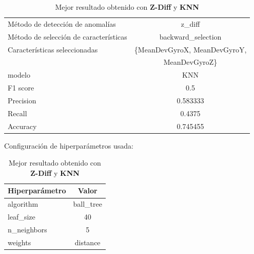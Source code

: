 \begin{appendices}
		\begin{table}[htb]
			\centering
			\caption{Mejor resultado obtenido con \textbf{Z-Diff} y \textbf{KNN}}
			\label{table:18}
			\begin{tabular}{lc}
				\toprule
				\midrule
					  Método de detección de anomalías &                                     z\_diff \\
				Método de selección de características &                         backward\_selection \\
						 Características seleccionadas & \{MeanDevGyroX, MeanDevGyroY, \\
						 							   & 							MeanDevGyroZ\}   \\
												modelo &                                        KNN \\
											  F1 score &                                        0.5 \\
											 Precision &                                   0.583333 \\
												Recall &                                     0.4375 \\
											  Accuracy &                                   0.745455 \\
				\bottomrule
			\end{tabular}
			\newline
			\newline
			Configuración de hiperparámetros usada:
			\begin{tabular}{lc}
				\toprule
				Hiperparámetro &     Valor \\
				\midrule
					 algorithm & ball\_tree \\
					 leaf\_size &        40 \\
				   n\_neighbors &         5 \\
					   weights &  distance \\
				\bottomrule
			\end{tabular}
			
		\end{table}


\end{appendices}
